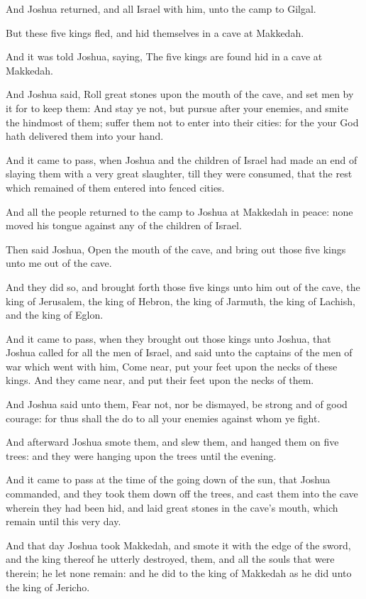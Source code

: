 \verse And Joshua returned, and all Israel with him, unto the camp to Gilgal.

\verse But these five kings fled, and hid themselves in a cave at Makkedah.

\verse And it was told Joshua, saying, The five kings are found hid in a cave at Makkedah.

\verse And Joshua said, Roll great stones upon the mouth of the cave, and set men by it for to keep them: \verse And stay ye not, but pursue after your enemies, and smite the hindmost of them; suffer them not to enter into their cities: for the \LORD your God hath delivered them into your hand.

\verse And it came to pass, when Joshua and the children of Israel had made an end of slaying them with a very great slaughter, till they were consumed, that the rest which remained of them entered into fenced cities.

\verse And all the people returned to the camp to Joshua at Makkedah in peace: none moved his tongue against any of the children of Israel.

\verse Then said Joshua, Open the mouth of the cave, and bring out those five kings unto me out of the cave.

\verse And they did so, and brought forth those five kings unto him out of the cave, the king of Jerusalem, the king of Hebron, the king of Jarmuth, the king of Lachish, and the king of Eglon.

\verse And it came to pass, when they brought out those kings unto Joshua, that Joshua called for all the men of Israel, and said unto the captains of the men of war which went with him, Come near, put your feet upon the necks of these kings. And they came near, and put their feet upon the necks of them.

\verse And Joshua said unto them, Fear not, nor be dismayed, be strong and of good courage: for thus shall the \LORD do to all your enemies against whom ye fight.

\verse And afterward Joshua smote them, and slew them, and hanged them on five trees: and they were hanging upon the trees until the evening.

\verse And it came to pass at the time of the going down of the sun, that Joshua commanded, and they took them down off the trees, and cast them into the cave wherein they had been hid, and laid great stones in the cave's mouth, which remain until this very day.

\verse And that day Joshua took Makkedah, and smote it with the edge of the sword, and the king thereof he utterly destroyed, them, and all the souls that were therein; he let none remain: and he did to the king of Makkedah as he did unto the king of Jericho.

